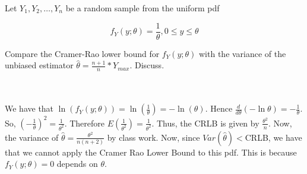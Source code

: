 Let $Y_1,Y_2,\ldots,Y_n$ be a random sample from the uniform pdf

$$f_Y(y;\theta)=\frac{1}{\theta}, 0\leq y\leq\theta$$

Compare the Cramer-Rao lower bound for $f_Y(y;\theta)$ with the variance of the unbiased estimator
$\hat{\theta}=\frac{n+1}{n}*Y_{max}$. Discuss.\\\\

\begin{solution}\renewcommand{\qedsymbol}{}\ \\
    We have that $\ln(f_Y(y;\theta))=\ln(\frac{1}{\theta})=-\ln(\theta)$.
    Hence $\frac{d}{d\theta}(-\ln{\theta})=-\frac{1}{\theta}$. So,
    $(-\frac{1}{\theta})^2=\frac{1}{\theta^2}$. Therefore $E(\frac{1}{\theta^2})=\frac{1}{\theta^2}$.
    Thus, the CRLB is given by $\frac{\theta^2}{n}.$ Now, the variance of
    $\hat{\theta}=\frac{\theta^2}{n(n+2)}$ by class work. Now, since $Var(\hat{\theta})<$CRLB, we have
    that we cannot apply the Cramer Rao Lower Bound to this pdf. This is because $f_Y(y;\theta)=0$
    depends on $\theta$.

\end{solution}